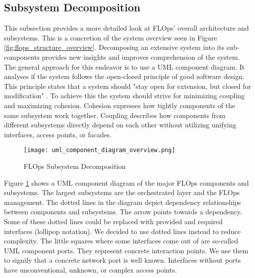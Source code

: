 \subsection{Subsystem Decomposition}
This subsection provides a more detailed look at FLOps' overall architecture and subsystems.
This is a concretion of the system overview seen in Figure \ref{fig:flops_structure_overview}.
Decomposing an extensive system into its sub-components provides new insights and improves comprehension of the system.
The general approach for this endeavor is to use a UML component diagram.
It analyses if the system follows the open-closed principle of good software design.
This principle states that a system should "stay open for extension, but closed for modification" \cite{book:bruegge}.
To achieve this the system should strive for minimizing coupling and maximizing cohesion.
Cohesion expresses how tightly components of the same subsystem work together.
Coupling describes how components from different subsystems directly depend on each other without utilizing unifying interfaces, access points, or facades.

\begin{figure}[p]
    \begin{adjustwidth}{-0.175\paperwidth}{-0.175\paperwidth}
        \centering
        \texttt{[image: uml\_component\_diagram\_overview.png]}
        \caption{FLOps Subsystem Decomposition}
        \label{fig:component_diagram_overview}
    \end{adjustwidth}
\end{figure}

Figure \ref{fig:component_diagram_overview} shows a UML component diagram of the major FLOps components and subsystems.
The largest subsystems are the orchestrated layer and the FLOps management.
The dotted lines in the diagram depict dependency relationships between components and subsystems.
The arrow points towards a dependency.
Some of these dotted lines could be replaced with provided and required interfaces (lollipop notation).
We decided to use dotted lines instead to reduce complexity.
The little squares where some interfaces come out of are so-called UML component ports.
They represent concrete interaction points.
We use them to signify that a concrete network port is well known.
Interfaces without ports have unconventional, unknown, or complex access points.

